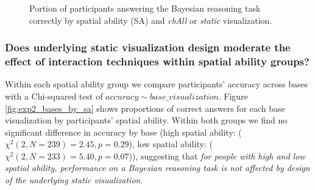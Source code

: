 
\begin{figure}[h!]
    \centering
    \caption{Portion of participants answering the Bayesian reasoning task correctly by spatial ability (SA) and \textit{cbAll} or \textit{static} visualization. } 
    \label{fig:exp2_sa_by_interaction}
\end{figure}

\subsubsection{Does underlying static visualization design moderate the effect of interaction techniques within spatial ability groups?}

Within each spatial ability group we compare participants' accuracy across bases with a Chi-squared test of $accuracy \sim base\_visualization$. Figure \ref{fig:exp2_bases_by_sa} shows proportions of correct answers for each base visualization by participants' spatial ability. Within both groups we find no significant difference in accuracy by base (high spatial ability: ($\chi^2(2, N = 239) = 2.45, p = 0.29$), low spatial ability: ($\chi^2(2, N = 233) = 5.40, p = 0.07$)), suggesting that \textit{for people with high and low spatial ability, performance on a Bayesian reasoning task is not affected by design of the underlying static visualization}. 

